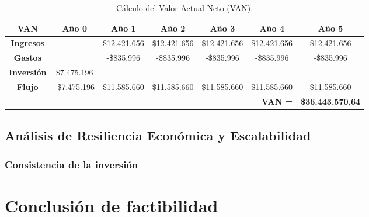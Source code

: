 \vspace{1em}
\begin{table}[H]
\centering
\renewcommand{\arraystretch}{1.3}
\setlength{\tabcolsep}{6pt}
\begin{tabular}{|c|c|c|c|c|c|c|}
\hline
\rowcolor[HTML]{EAEAEA}
\textbf{VAN} & \textbf{Año 0} & \textbf{Año 1} & \textbf{Año 2} & \textbf{Año 3} & \textbf{Año 4} & \textbf{Año 5} \\ \hline
\textbf{Ingresos} &  & \$12.421.656 & \$12.421.656 & \$12.421.656 & \$12.421.656 & \$12.421.656 \\ \hline
\textbf{Gastos} &  & -\$835.996 & -\$835.996 & -\$835.996 & -\$835.996 & -\$835.996 \\ \hline
\textbf{Inversión} & \$7.475.196 &  &  &  &  &  \\ \hline
\textbf{Flujo} & -\$7.475.196 & \$11.585.660 & \$11.585.660 & \$11.585.660 & \$11.585.660 & \$11.585.660 \\ \hline
\multicolumn{6}{|r|}{\cellcolor[HTML]{EAEAEA}\textbf{VAN =}} & \cellcolor[HTML]{EAEAEA}\textbf{\$36.443.570,64} \\ \hline
\end{tabular}
\caption{Cálculo del Valor Actual Neto (VAN).}
\label{tab:van}
\end{table}

\subsection{Análisis de Resiliencia Económica y Escalabilidad}



\subsubsection*{Consistencia de la inversión} 


\section{Conclusión de factibilidad}
